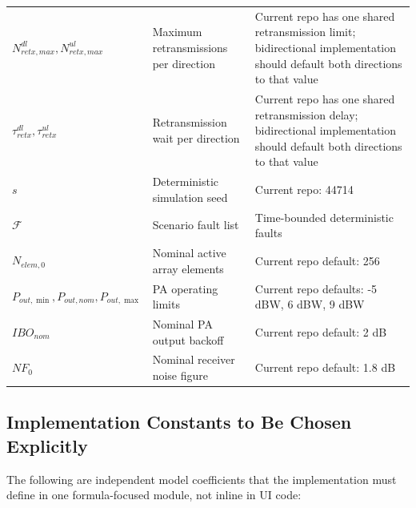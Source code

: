 \documentclass[11pt]{article}
\begin{document}
\begin{longtable}{p{} p{} p{}}
$N^{dl}_{retx,max}, N^{ul}_{retx,max}$ & Maximum retransmissions per direction & Current repo has one shared retransmission limit; bidirectional implementation should default both directions to that value \\
$\tau^{dl}_{retx}, \tau^{ul}_{retx}$ & Retransmission wait per direction & Current repo has one shared retransmission delay; bidirectional implementation should default both directions to that value \\
$s$ & Deterministic simulation seed & Current repo: 44714 \\
$\mathcal{F}$ & Scenario fault list & Time-bounded deterministic faults \\
$N_{elem,0}$ & Nominal active array elements & Current repo default: 256 \\
$P_{out,\min}, P_{out,nom}, P_{out,\max}$ & PA operating limits & Current repo defaults: -5 dBW, 6 dBW, 9 dBW \\
$IBO_{nom}$ & Nominal PA output backoff & Current repo default: 2 dB \\
$NF_0$ & Nominal receiver noise figure & Current repo default: 1.8 dB \\
\bottomrule
\end{longtable}

\subsection{Implementation Constants to Be Chosen Explicitly}

The following are independent model coefficients that the implementation must define in
one formula-focused module, not inline in UI code:
\end{document}
